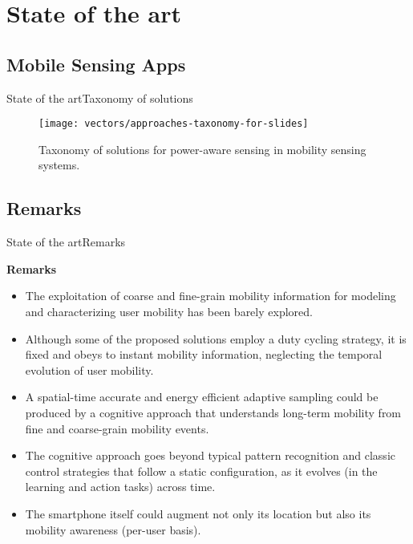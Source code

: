 \section{State of the art}
\subsection{Mobile Sensing Apps}
\begin{frame}{State of the art}{Taxonomy of solutions}
\begin{figure}
  \centering
  \texttt{[image: vectors/approaches-taxonomy-for-slides]}
  \caption{Taxonomy of solutions for power-aware sensing in mobility sensing systems.}
\end{figure}
\end{frame}

\subsection{Remarks}
\begin{frame}{State of the art}{Remarks}
\small
\begin{block}{\small \textbf{Remarks}}
\begin{itemize}
  \item The exploitation of coarse and fine-grain mobility information for modeling and characterizing user mobility has been barely explored.
  \item Although some of the proposed solutions employ a duty cycling strategy, it is fixed and obeys to instant mobility information, neglecting the temporal evolution of user mobility.
  \item A spatial-time accurate and energy efficient adaptive sampling could be produced by a cognitive approach that understands long-term mobility from fine and coarse-grain mobility events.
  \item The cognitive approach goes beyond typical pattern recognition and classic control strategies that follow a static configuration, as it evolves (in the learning and action tasks) across time.
  \item The smartphone itself could augment not only its location but also its mobility awareness (per-user basis).
\end{itemize}
\end{block}
\end{frame}